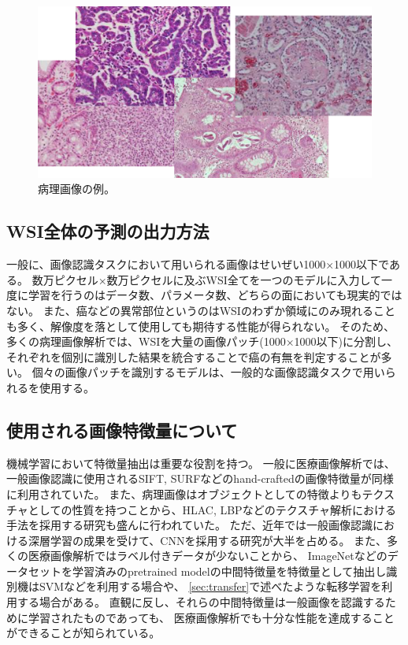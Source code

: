 \begin{figure}[tbp]
    \label{fig:path_images}
     \begin{center}
      \includegraphics[width=13cm]{figures/path_images.png}
     \end{center}
    \caption{病理画像の例。}
\end{figure}
    
\subsection{WSI全体の予測の出力方法}
一般に、画像認識タスクにおいて用いられる画像はせいぜい1000×1000以下である。
数万ピクセル×数万ピクセルに及ぶWSI全てを一つのモデルに入力して一度に学習を行うのはデータ数、パラメータ数、どちらの面においても現実的ではない。
また、癌などの異常部位というのはWSIのわずか領域にのみ現れることも多く、解像度を落として使用しても期待する性能が得られない。
そのため、多くの病理画像解析では、WSIを大量の画像パッチ(1000×1000以下)に分割し、それぞれを個別に識別した結果を統合することで癌の有無を判定することが多い。
個々の画像パッチを識別するモデルは、一般的な画像認識タスクで用いられるを使用する。

\subsection{使用される画像特徴量について}
機械学習において特徴量抽出は重要な役割を持つ。
一般に医療画像解析では、一般画像認識に使用されるSIFT, SURFなどのhand-craftedの画像特徴量が同様に利用されていた。
また、病理画像はオブジェクトとしての特徴よりもテクスチャとしての性質を持つことから、HLAC, LBPなどのテクスチャ解析における手法を採用する研究も盛んに行われていた。
ただ、近年では一般画像認識における深層学習の成果を受けて、CNNを採用する研究が大半を占める。
また、多くの医療画像解析ではラベル付きデータが少ないことから、
ImageNetなどのデータセットを学習済みのpretrained modelの中間特徴量を特徴量として抽出し識別機はSVMなどを利用する場合や、
\ref{sec:transfer}で述べたような転移学習を利用する場合がある。
直観に反し、それらの中間特徴量は一般画像を認識するために学習されたものであっても、
医療画像解析でも十分な性能を達成することができることが知られている。

